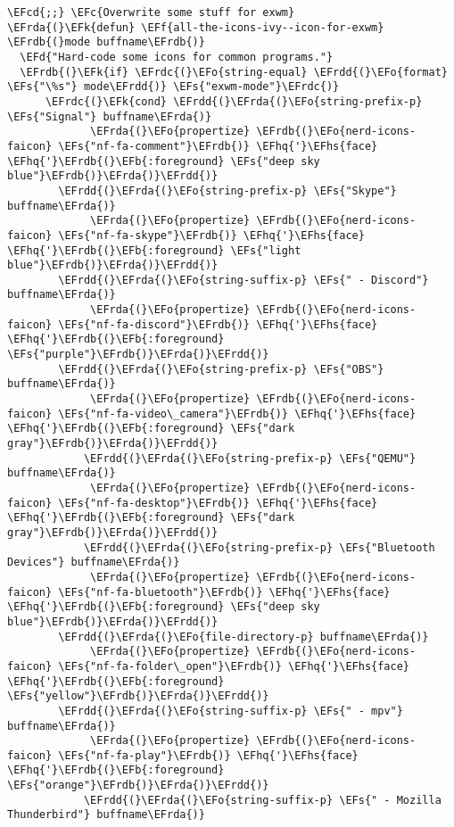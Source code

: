 \documentclass[a4wide,10pt]{article}
\newcommand{\EFc}[1]{\textcolor{EFc}{#1}} %
\newcommand{\EFcd}[1]{\textcolor{EFcd}{#1}} %
\newcommand{\EFs}[1]{\textcolor{EFs}{#1}} %
\newcommand{\EFd}[1]{\textcolor{EFd}{#1}} %
\newcommand{\EFk}[1]{\textcolor{EFk}{#1}} %
\newcommand{\EFb}[1]{\textcolor{EFb}{#1}} %
\newcommand{\EFf}[1]{\textcolor{EFf}{#1}} %
\newcommand{\EFo}[1]{\textcolor{EFo}{#1}} %
\newcommand{\EFhq}[1]{\textcolor{EFhq}{#1}} %
\newcommand{\EFhs}[1]{\textcolor{EFhs}{#1}} %
\newcommand{\EFrda}[1]{\textcolor{EFrda}{#1}} %
\newcommand{\EFrdb}[1]{\textcolor{EFrdb}{#1}} %
\newcommand{\EFrdc}[1]{\textcolor{EFrdc}{#1}} %
\newcommand{\EFrdd}[1]{\textcolor{EFrdd}{#1}} %
\begin{document}
\begin{Code}
\begin{Verbatim}
\EFcd{;;} \EFc{Overwrite some stuff for exwm}
\EFrda{(}\EFk{defun} \EFf{all-the-icons-ivy--icon-for-exwm} \EFrdb{(}mode buffname\EFrdb{)}
  \EFd{"Hard-code some icons for common programs."}
  \EFrdb{(}\EFk{if} \EFrdc{(}\EFo{string-equal} \EFrdd{(}\EFo{format} \EFs{"\%s"} mode\EFrdd{)} \EFs{"exwm-mode"}\EFrdc{)}
      \EFrdc{(}\EFk{cond} \EFrdd{(}\EFrda{(}\EFo{string-prefix-p} \EFs{"Signal"} buffname\EFrda{)}
             \EFrda{(}\EFo{propertize} \EFrdb{(}\EFo{nerd-icons-faicon} \EFs{"nf-fa-comment"}\EFrdb{)} \EFhq{'}\EFhs{face} \EFhq{'}\EFrdb{(}\EFb{:foreground} \EFs{"deep sky blue"}\EFrdb{)}\EFrda{)}\EFrdd{)}
	    \EFrdd{(}\EFrda{(}\EFo{string-prefix-p} \EFs{"Skype"} buffname\EFrda{)}
             \EFrda{(}\EFo{propertize} \EFrdb{(}\EFo{nerd-icons-faicon} \EFs{"nf-fa-skype"}\EFrdb{)} \EFhq{'}\EFhs{face} \EFhq{'}\EFrdb{(}\EFb{:foreground} \EFs{"light blue"}\EFrdb{)}\EFrda{)}\EFrdd{)}
	    \EFrdd{(}\EFrda{(}\EFo{string-suffix-p} \EFs{" - Discord"} buffname\EFrda{)}
             \EFrda{(}\EFo{propertize} \EFrdb{(}\EFo{nerd-icons-faicon} \EFs{"nf-fa-discord"}\EFrdb{)} \EFhq{'}\EFhs{face} \EFhq{'}\EFrdb{(}\EFb{:foreground} \EFs{"purple"}\EFrdb{)}\EFrda{)}\EFrdd{)}
	    \EFrdd{(}\EFrda{(}\EFo{string-prefix-p} \EFs{"OBS"} buffname\EFrda{)}
             \EFrda{(}\EFo{propertize} \EFrdb{(}\EFo{nerd-icons-faicon} \EFs{"nf-fa-video\_camera"}\EFrdb{)} \EFhq{'}\EFhs{face} \EFhq{'}\EFrdb{(}\EFb{:foreground} \EFs{"dark gray"}\EFrdb{)}\EFrda{)}\EFrdd{)}
            \EFrdd{(}\EFrda{(}\EFo{string-prefix-p} \EFs{"QEMU"} buffname\EFrda{)}
             \EFrda{(}\EFo{propertize} \EFrdb{(}\EFo{nerd-icons-faicon} \EFs{"nf-fa-desktop"}\EFrdb{)} \EFhq{'}\EFhs{face} \EFhq{'}\EFrdb{(}\EFb{:foreground} \EFs{"dark gray"}\EFrdb{)}\EFrda{)}\EFrdd{)}
            \EFrdd{(}\EFrda{(}\EFo{string-prefix-p} \EFs{"Bluetooth Devices"} buffname\EFrda{)}
             \EFrda{(}\EFo{propertize} \EFrdb{(}\EFo{nerd-icons-faicon} \EFs{"nf-fa-bluetooth"}\EFrdb{)} \EFhq{'}\EFhs{face} \EFhq{'}\EFrdb{(}\EFb{:foreground} \EFs{"deep sky blue"}\EFrdb{)}\EFrda{)}\EFrdd{)}
	    \EFrdd{(}\EFrda{(}\EFo{file-directory-p} buffname\EFrda{)}
             \EFrda{(}\EFo{propertize} \EFrdb{(}\EFo{nerd-icons-faicon} \EFs{"nf-fa-folder\_open"}\EFrdb{)} \EFhq{'}\EFhs{face} \EFhq{'}\EFrdb{(}\EFb{:foreground} \EFs{"yellow"}\EFrdb{)}\EFrda{)}\EFrdd{)}
	    \EFrdd{(}\EFrda{(}\EFo{string-suffix-p} \EFs{" - mpv"} buffname\EFrda{)}
             \EFrda{(}\EFo{propertize} \EFrdb{(}\EFo{nerd-icons-faicon} \EFs{"nf-fa-play"}\EFrdb{)} \EFhq{'}\EFhs{face} \EFhq{'}\EFrdb{(}\EFb{:foreground} \EFs{"orange"}\EFrdb{)}\EFrda{)}\EFrdd{)}
            \EFrdd{(}\EFrda{(}\EFo{string-suffix-p} \EFs{" - Mozilla Thunderbird"} buffname\EFrda{)}

\end{Verbatim}
\end{Code}
\end{document}
